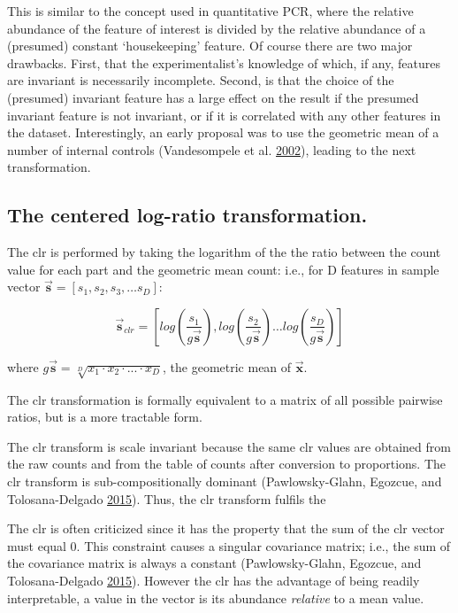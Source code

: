 \documentclass[onecolumn]{book}
\newcommand{\vect}[1]{\vec{\textbf{#1}}}
\theoremstyle{definition}
\theoremstyle{definition}
\theoremstyle{definition}
\theoremstyle{remark}
\begin{document}
This is similar to the concept used in quantitative PCR, where the
relative abundance of the feature of interest is divided by the relative
abundance of a (presumed) constant `housekeeping' feature. Of course
there are two major drawbacks. First, that the experimentalist's
knowledge of which, if any, features are invariant is necessarily
incomplete. Second, is that the choice of the (presumed) invariant
feature has a large effect on the result if the presumed invariant
feature is not invariant, or if it is correlated with any other features
in the dataset. Interestingly, an early proposal was to use the
geometric mean of a number of internal controls (Vandesompele et al.
\protect\hyperlink{ref-Vandesompele:2002aa}{2002}), leading to the next
transformation.

\hypertarget{the-centered-log-ratio-transformation.}{%
\subsection{The centered log-ratio
transformation.}\label{the-centered-log-ratio-transformation.}}

The clr is performed by taking the logarithm of the the ratio between
the count value for each part and the geometric mean count: i.e., for D
features in sample vector \(\vect{s} = [s_1, s_2, s_3, \ldots s_D]\):

\begin{equation}
 \vect{s}_{clr}  = [log(\frac{s_1}{g\vect{s}}), log(\frac{s_2}{g\vect{s}}) \ldots log(\frac{s_D}{g\vect{s}})]
\end{equation}

where \(g\vect{s} = \sqrt[D]{x_1 \cdot x_2 \cdot ... \cdot x_D}\), the
geometric mean of \(\vec{\textbf{x}}\).

The clr transformation is formally equivalent to a matrix of all
possible pairwise ratios, but is a more tractable form.

The clr transform is scale invariant because the same clr values are
obtained from the raw counts and from the table of counts after
conversion to proportions. The clr transform is sub-compositionally
dominant (Pawlowsky-Glahn, Egozcue, and Tolosana-Delgado
\protect\hyperlink{ref-pawlowsky2015modeling}{2015}). Thus, the clr
transform fulfils the

The clr is often criticized since it has the property that the sum of
the clr vector must equal 0. This constraint causes a singular
covariance matrix; i.e., the sum of the covariance matrix is always a
constant (Pawlowsky-Glahn, Egozcue, and Tolosana-Delgado
\protect\hyperlink{ref-pawlowsky2015modeling}{2015}). However the clr
has the advantage of being readily interpretable, a value in the vector
is its abundance \emph{relative} to a mean value.
\end{document}
